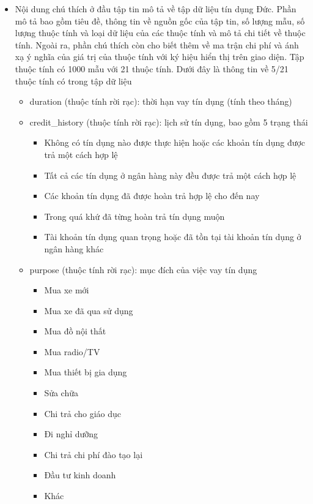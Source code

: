 \documentclass[a4paper, 12pt]{article}
\begin{document}
\begin{itemize}
    \item Nội dung chú thích ở đầu tập tin mô tả về tập dữ liệu tín dụng Đức. Phần mô tả bao gồm tiêu đề, thông tin về nguồn gốc của tập tin, số lượng mẫu, số lượng thuộc tính và loại dữ liệu của các thuộc tính và mô tả chi tiết về thuộc tính. Ngoài ra, phần chú thích còn cho biết thêm về ma trận chi phí và ánh xạ ý nghĩa của giá trị của thuộc tính với ký hiệu hiển thị trên giao diện. Tập thuộc tính có 1000 mẫu với 21 thuộc tính. Dưới đây là thông tin về 5/21 thuộc tính có trong tập dữ liệu
    \begin{itemize}
        \item duration (thuộc tính rời rạc): thời hạn vay tín dụng (tính theo tháng)

        \item credit\_history (thuộc tính rời rạc): lịch sử tín dụng, bao gồm 5 trạng thái
        \begin{itemize}
            \item Không có tín dụng nào được thực hiện hoặc các khoản tín dụng được trả một cách hợp lệ
            \item Tất cả các tín dụng ở ngân hàng này đều được trả một cách hợp lệ 
            \item Các khoản tín dụng đã được hoàn trả hợp lệ cho đến nay
            \item Trong quá khứ đã từng hoàn trả tín dụng muộn 
            \item Tài khoản tín dụng quan trọng hoặc đã tồn tại tài khoản tín dụng ở ngân hàng khác
        \end{itemize}

        \item purpose (thuộc tính rời rạc): mục đích của việc vay tín dụng
        \begin{itemize}
            \item Mua xe mới
            \item Mua xe đã qua sử dụng
            \item Mua đồ nội thất
            \item Mua radio/TV
            \item Mua thiết bị gia dụng
            \item Sửa chữa
            \item Chi trả cho giáo dục
            \item Đi nghỉ dưỡng
            \item Chi trả chi phí đào tạo lại
            \item Đầu tư kinh doanh
            \item Khác 
        \end{itemize}


\end{itemize}
\end{itemize}
\end{document}
